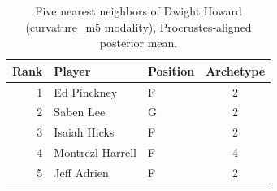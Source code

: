 \begin{table}[htbp]
  \centering\small
  \begin{tabular}{rllc}
    \toprule
    Rank & Player & Position & Archetype \\
    \midrule
    1 & Ed Pinckney & F & 2 \\
    2 & Saben Lee & G & 2 \\
    3 & Isaiah Hicks & F & 2 \\
    4 & Montrezl Harrell & F & 4 \\
    5 & Jeff Adrien & F & 2 \\
    \bottomrule
  \end{tabular}
  \caption{Five nearest neighbors of Dwight Howard (curvature_m5 modality), Procrustes-aligned posterior mean.}
  \label{tab:Dwight_Howard_neighbors_curvature_m5}
\end{table}

